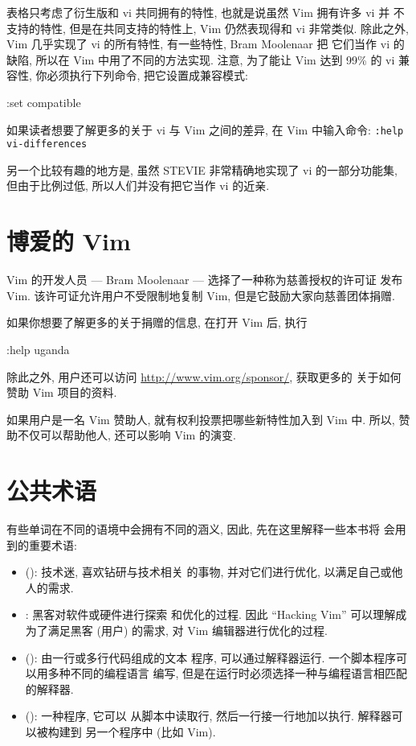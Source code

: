 表格只考虑了衍生版和 vi 共同拥有的特性, 也就是说虽然 Vim 拥有许多 vi 并
不支持的特性, 但是在共同支持的特性上, Vim 仍然表现得和 vi 非常类似.
除此之外, Vim 几乎实现了 vi 的所有特性, 有一些特性, Bram Moolenaar 把
它们当作 vi 的缺陷, 所以在 Vim 中用了不同的方法实现. 注意, 为了能让
Vim 达到 99\% 的 vi 兼容性, 你必须执行下列命令, 把它设置成兼容模式:
\begin{vimcode}
:set compatible
\end{vimcode}
\begin{warning}
    如果读者想要了解更多的关于 vi 与 Vim 之间的差异, 在 Vim 中输入命令:
    \texttt{:help vi-differences}
\end{warning}
另一个比较有趣的地方是, 虽然 STEVIE 非常精确地实现了 vi 的一部分功能集,
但由于比例过低, 所以人们并没有把它当作 vi 的近亲.

\section{博爱的 Vim}
\label{sec:vim_is_charityware}
Vim 的开发人员 --- Bram Moolenaar --- 选择了一种称为慈善授权的许可证
发布 Vim. 该许可证允许用户不受限制地复制 Vim, 但是它鼓励大家向慈善团体捐赠.

如果你想要了解更多的关于捐赠的信息, 在打开 Vim 后, 执行
\begin{vimcode}
:help uganda
\end{vimcode}
除此之外, 用户还可以访问 \url{http://www.vim.org/sponsor/}, 获取更多的
关于如何赞助 Vim 项目的资料.

如果用户是一名 Vim 赞助人, 就有权利投票把哪些新特性加入到 Vim 中. 所以,
赞助不仅可以帮助他人, 还可以影响 Vim 的演变.

\section{公共术语}
\label{sec:common_terminology}

有些单词在不同的语境中会拥有不同的涵义, 因此, 先在这里解释一些本书将
会用到的重要术语:
\begin{itemize}
    \item {} (): 技术迷, 喜欢钻研与技术相关
        的事物, 并对它们进行优化, 以满足自己或他人的需求.
    \item {}: 黑客对软件或硬件进行探索
        和优化的过程. 因此 ``Hacking Vim'' 可以理解成为了满足黑客 (用户)
        的需求, 对 Vim 编辑器进行优化的过程.
    \item {} (): 由一行或多行代码组成的文本
        程序, 可以通过解释器运行. 一个脚本程序可以用多种不同的编程语言
        编写, 但是在运行时必须选择一种与编程语言相匹配的解释器.
    \item {} (): 一种程序, 它可以
        从脚本中读取行, 然后一行接一行地加以执行. 解释器可以被构建到
        另一个程序中 (比如 Vim).
\end{itemize}
